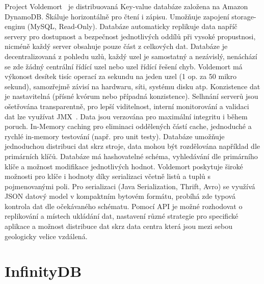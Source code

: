 \documentclass[czech,bachelor,dept460,male,csharp,cpdeclaration]{diploma}
\begin{document}
	Project Voldemort~\cite{voldemort} je distribuovaná Key-value databáze založena na Amazon DynamoDB. Škáluje horizontálně pro čtení i zápisu. Umožňuje zapojení storage-enginu (MySQL, Read-Only). Databáze automaticky replikuje data napříč servery pro dostupnost a bezpečnost jednotlivých oddílů při vysoké propustnosi, nicméně každý server obsahuje pouze část z celkových dat. Databáze je decentralizovaná z pohledu uzlů, každý uzel je samostatný a nezávislý, nenáchází se zde žádný centrální řídící uzel nebo uzel řídící řešení chyb. Voldemort má výkonost desítek tisíc operací za sekundu na jeden uzel (1 op. za 50 mikro sekund), samozřejmě závisí na hardwaru, síti, systému disku atp. Konzistence dat je nastavitelná (přísné kvórum nebo případná konzistence). Selhnání serverů jsou ošetřována transparentně, pro lepší viditelnost, interní monitorování a validaci dat lze využívat JMX~\cite{jmx}. Data jsou verzována pro maximální integritu i během poruch. In-Memory caching pro eliminaci oddělených částí cache, jednoduché a rychlé in-memory testování (např. pro unit testy). Databáze umožňuje jednoduchou distribuci dat skrz stroje, data mohou být rozdělována například dle primárních klíčů. Databáze má hashovatelné schéma, vyhledávání dle primárního klíče a možnost modifikace jednotlivých hodnot. Voldemort poskytuje široké možnosti pro klíče i hodnoty díky serializaci včetně listů a tuplů s pojmenovanými poli. Pro serializaci (Java Serialization, Thrift, Avro) se využívá JSON datový model v kompaktním bytovém formátu, probíhá zde typová kontrola dat dle očekávaného schématu. Pomocí API je možné rozhodovat o replikování a místech ukládání dat, nastavení různé strategie pro specifické aplikace a možnost distribuce dat skrz data centra která jsou mezi sebou geologicky velice vzdálená.
	
	\section{InfinityDB}
	
\end{document}
